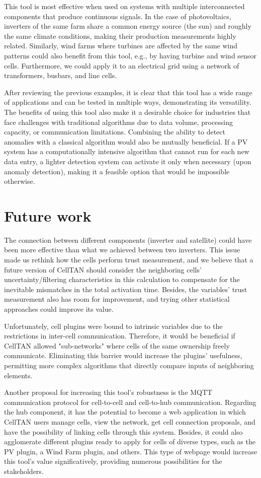 This tool is most effective when used on systems with multiple interconnected components that produce continuous signals. In the case of photovoltaics, inverters of the same farm share a common energy source (the sun) and roughly the same climate conditions, making their production measurements highly related. Similarly, wind farms where turbines are affected by the same wind patterns could also benefit from this tool, e.g., by having turbine and wind sensor cells. Furthermore, we could apply it to an electrical grid using a network of transformers, busbars, and line cells.

After reviewing the previous examples, it is clear that this tool has a wide range of applications and can be tested in multiple ways, demonstrating its versatility. The benefits of using this tool also make it a desirable choice for industries that face challenges with traditional algorithms due to data volume, processing capacity, or communication limitations. Combining the ability to detect anomalies with a classical algorithm would also be mutually beneficial. If a PV system has a computationally intensive algorithm that cannot run for each new data entry, a lighter detection system can activate it only when necessary (upon anomaly detection), making it a feasible option that would be impossible otherwise.

\section{Future work}

The connection between different components (inverter and satellite) could have been more effective than what we achieved between two inverters. This issue made us rethink how the cells perform trust measurement, and we believe that a future version of CellTAN should consider the neighboring cells' uncertainty/filtering characteristics in this calculation to compensate for the inevitable mismatches in the total activation time. Besides, the variables' trust measurement also has room for improvement, and trying other statistical approaches could improve its value.

Unfortunately, cell plugins were bound to intrinsic variables due to the restrictions in inter-cell communication. Therefore, it would be beneficial if CellTAN allowed "sub-networks" where cells of the same ownership freely communicate. Eliminating this barrier would increase the plugins' usefulness, permitting more complex algorithms that directly compare inputs of neighboring elements.

Another proposal for increasing this tool's robustness is the MQTT communication protocol for cell-to-cell and cell-to-hub communication. Regarding the hub component, it has the potential to become a web application in which CellTAN users manage cells, view the network, get cell connection proposals, and have the possibility of linking cells through this system. Besides, it could also agglomerate different plugins ready to apply for cells of diverse types, such as the PV plugin, a Wind Farm plugin, and others. This type of webpage would increase this tool's value significatively, providing numerous possibilities for the stakeholders.


